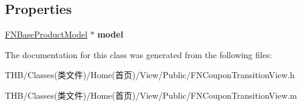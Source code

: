 \subsection*{Properties}
\begin{DoxyCompactItemize}
\item 
\mbox{\label{interface_f_n_coupon_transition_view_a280184420ad6cb8fd9794b7cca7a5c8e}} 
\mbox{\hyperlink{interface_f_n_base_product_model}{F\+N\+Base\+Product\+Model}} $\ast$ {\bfseries model}
\end{DoxyCompactItemize}


The documentation for this class was generated from the following files\+:\begin{DoxyCompactItemize}
\item 
T\+H\+B/\+Classes(类文件)/\+Home(首页)/\+View/\+Public/F\+N\+Coupon\+Transition\+View.\+h\item 
T\+H\+B/\+Classes(类文件)/\+Home(首页)/\+View/\+Public/F\+N\+Coupon\+Transition\+View.\+m\end{DoxyCompactItemize}
